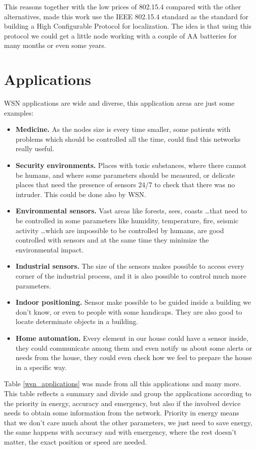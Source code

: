 This reasons together with the low prices of 802.15.4 compared with the other alternatives, made this work use the \ac{IEEE} 802.15.4 
standard as the standard for building a High Configurable Protocol for localization. The idea is that using this protocol we could
get a little node working with a couple of AA batteries for many months or even some years.

\section{Applications}

\ac{WSN} applications are wide and diverse, this application areas are just some examples:

\begin{itemize}
 \item \textbf{Medicine.} As the nodes size is every time smaller, some patients with problems which should be controlled all the time,
could find this networks really useful.
 \item \textbf{Security environments.} Places with toxic substances, where there cannot be humans, and where some parameters should be measured,
or delicate places that need the presence of sensors 24/7 to check that there was no intruder. This could be done also by \ac{WSN}.
 \item \textbf{Environmental sensors.} Vast areas like forests, sees, coasts \ldots that need to be controlled in some parameters like
humidity, temperature, fire, seismic activity \ldots which are impossible to be controlled by humans, are good controlled with sensors
and at the same time they minimize the environmental impact.
 \item \textbf{Industrial sensors.} The size of the sensors makes possible to access every corner of the industrial process, and it is also
possible to control much more parameters.
 \item \textbf{Indoor positioning.} Sensor make possible to be guided inside a building we don't know, or even to people with some handicaps.
They are also good to locate determinate objects in a building.
 \item \textbf{Home automation.} Every element in our house could have a sensor inside, they could communicate among them and even notify us
about some alerts or needs from the house, they could even check how we feel to prepare the house in a specific way.
\end{itemize}

Table \ref{wsn_applications} was made from all this applications and many more. This table reflects a summary and divide and group
the applications according to the priority in energy, accuracy and emergency, but also if the involved device needs to obtain some information
from the network. Priority in energy means that we don't care much about the other parameters, we just need to save energy, the same happens 
with accuracy and with emergency, where the rest doesn't matter, the exact position or speed are needed.

